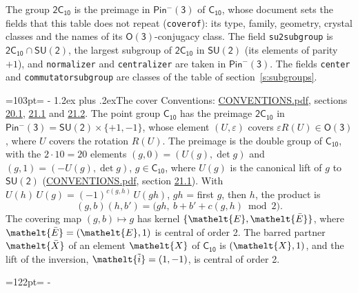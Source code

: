 \documentclass[10pt,a4paper]{article}
\makeatletter
\renewcommand\section{\@startsection{section}{1}{\z@}{-3ex plus -1ex minus -.2ex}%
  {1.2ex plus .2ex}{\normalfont\large\sffamily\bfseries\color{parttitle}}}
\newcommand{\needspace}[1]{\par\penalty-100\begingroup\dimen0=#1\relax\dimen2=\pagegoal
  \advance\dimen2-\pagetotal\ifdim\dimen0>\dimen2\relax\ifdim\dimen2>0pt\vfil\break\fi\fi
  \endgroup}
\numberwithin{equation}{section}
\newcommand{\eltfont}[1]{{\let\sigma\eltsigma\mathelt{#1}}}
\newcommand{\grp}[1]{\mathsf{#1}}
\newcommand{\elt}[1]{\eltfont{#1}}
\newcommand{\dirprod}{\times}
\newcommand{\barred}[1]{\bar{#1}}
\newcommand{\lift}[1]{\tilde{#1}}
\makeatother
\begin{document}
\leavevmode\label{n:element.inversion}\label{n:group.preimage}The group $\grp{2C_{10}}$ is the preimage in $\grp{Pin^{-}(3)}$ of \href{../../../rotation/data/pdf/C10.pdf}{$\grp{C_{10}}$}, whose document sets the fields that this table does not repeat (\texttt{coverof}): its type, family, geometry, crystal classes and the names of its \href{../../../rotation/data/pdf/O3.pdf}{$\grp{O(3)}$}-conjugacy class. The field \texttt{su2subgroup} is $\grp{2C_{10}} \cap \grp{SU(2)}$, the largest subgroup of $\grp{2C_{10}}$ in $\grp{SU(2)}$ (its elements of parity $+1$), and \texttt{normalizer} and \texttt{centralizer} are taken in $\grp{Pin^{-}(3)}$. The fields \texttt{center} and \texttt{commutatorsubgroup} are classes of the table of section~\ref{s:subgroups}.
\needspace{103pt}
\section{The cover}\label{s:cover}
Conventions: \href{../../CONVENTIONS.pdf}{CONVENTIONS.pdf}, sections \href{../../CONVENTIONS.pdf\#conv.20.1}{20.1}, \href{../../CONVENTIONS.pdf\#conv.21.1}{21.1} and \href{../../CONVENTIONS.pdf\#conv.21.2}{21.2}.
\leavevmode\label{n:group.pin.minus}\label{n:group.su2}\label{n:local.pin.sign}\label{n:matrix.covered}\label{n:matrix.lift.su2}\label{n:index.bar}The point group $\grp{C_{10}}$ has the preimage $\grp{2C_{10}}$ in $\grp{Pin^{-}(3)} = \grp{SU(2)} \dirprod \{+1, -1\}$, whose element $(U, \varepsilon)$ covers $\varepsilon R(U) \in \grp{O(3)}$, where $U$ covers the rotation $R(U)$. The preimage is the double group of $\grp{C_{10}}$, with the $2 \cdot 10 = 20$ elements $(g, 0) = (U(g), \det g)$ and $(g, 1) = (-U(g), \det g)$, $g \in \grp{C_{10}}$, where $U(g)$ is the canonical lift of $g$ to $\grp{SU(2)}$ (\href{../../CONVENTIONS.pdf}{CONVENTIONS.pdf}, section \href{../../CONVENTIONS.pdf\#conv.21.1}{21.1}). \label{n:function.cocycle}With $U(h)\,U(g) = (-1)^{c(g,h)}\,U(gh)$, $gh$ = first $g$, then $h$, the product is
\begin{equation}\label{e:product}(g, b)(h, b') = \bigl(gh,\ b + b' + c(g, h) \bmod 2\bigr).\end{equation}
\leavevmode\label{n:mark.bar}The covering map $(g, b) \mapsto g$ has kernel $\{\elt{E}, \elt{\barred{E}}\}$, where $\elt{\barred{E}} = (\elt{E}, 1)$ is central of order 2. \label{n:element.named}\label{n:mark.lift}The barred partner $\elt{\barred{X}}$ of an element $\elt{X}$ of $\grp{C_{10}}$ is $(\elt{X}, 1)$, and the lift of the inversion, $\elt{\lift{i}} = (1, -1)$, is central of order 2.
\needspace{122pt}
\end{document}
